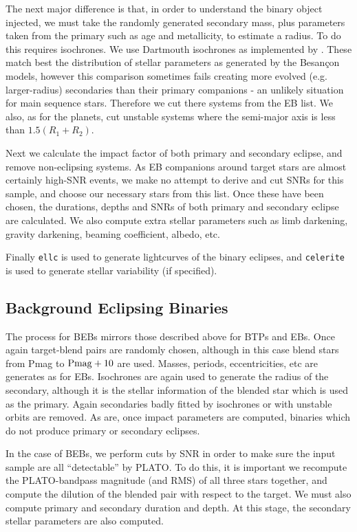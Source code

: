 \documentclass{article}
\begin{document}
The next major difference is that, in order to understand the binary object injected, we must take the randomly generated secondary mass, plus parameters taken from the primary such as age and metallicity, to estimate a radius.
To do this requires isochrones. We use Dartmouth isochrones as implemented by \citet{morton2015isochrones}. 
These match best the distribution of stellar parameters as generated by the Besan\c{c}on models, however this comparison sometimes fails creating more evolved (e.g. larger-radius) secondaries than their primary companions - an unlikely situation for main sequence stars.
Therefore we cut there systems from the EB list.
We also, as for the planets, cut unstable systems where the semi-major axis is less than $1.5(R_1+R_2)$.

Next we calculate the impact factor of both primary and secondary eclipse, and remove non-eclipsing systems.
As EB companions around target stars are almost certainly high-SNR events, we make no attempt to derive and cut SNRs for this sample, and choose our necessary stars from this list.
Once these have been chosen, the durations, depths and SNRs of both primary and secondary eclipse are calculated.
We also compute extra stellar parameters such as limb darkening, gravity darkening, beaming coefficient, albedo, etc.

Finally \texttt{ellc} is used to generate lightcurves of the binary eclipses, and \texttt{celerite} is used to generate stellar variability (if specified). 

\subsection{Background Eclipsing Binaries}

The process for BEBs mirrors those described above for BTPs and EBs.
Once again target-blend pairs are randomly chosen, although in this case blend stars from Pmag to ${\rm Pmag}+10$ are used.
Masses, periods, eccentricities, etc are generates as for EBs.
Isochrones are  again used to generate the radius of the secondary, although it is the stellar information of the blended star which is used as the primary.
Again secondaries badly fitted by isochrones or with unstable orbits are removed. As are, once impact parameters are computed, binaries which do not produce primary or secondary eclipses.

In the case of BEBs, we perform cuts by SNR in order to make sure the input sample are all “detectable” by PLATO. 
To do this, it is important we recompute the PLATO-bandpass magnitude (and RMS) of all three stars together, and compute the dilution of the blended pair with respect to the target.
We must also compute primary and secondary duration and depth.
At this stage, the secondary stellar parameters are also computed.
\end{document}
